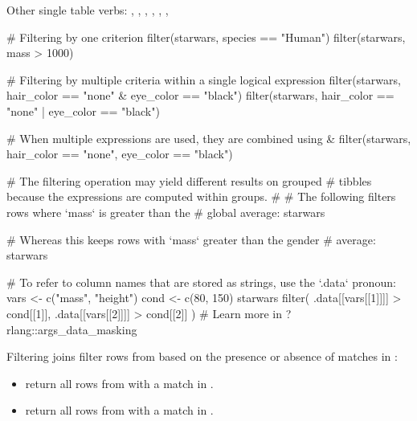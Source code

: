 \documentclass[a4paper]{book}
\begin{document}
%
\begin{SeeAlso}
Other single table verbs: 
,
,
,
,
,
,
\end{SeeAlso}
%
\begin{Examples}
\begin{ExampleCode}
# Filtering by one criterion
filter(starwars, species == "Human")
filter(starwars, mass > 1000)

# Filtering by multiple criteria within a single logical expression
filter(starwars, hair_color == "none" & eye_color == "black")
filter(starwars, hair_color == "none" | eye_color == "black")

# When multiple expressions are used, they are combined using &
filter(starwars, hair_color == "none", eye_color == "black")


# The filtering operation may yield different results on grouped
# tibbles because the expressions are computed within groups.
#
# The following filters rows where `mass` is greater than the
# global average:
starwars %

# Whereas this keeps rows with `mass` greater than the gender
# average:
starwars %


# To refer to column names that are stored as strings, use the `.data` pronoun:
vars <- c("mass", "height")
cond <- c(80, 150)
starwars %
  filter(
    .data[[vars[[1]]]] > cond[[1]],
    .data[[vars[[2]]]] > cond[[2]]
  )
# Learn more in ?rlang::args_data_masking
\end{ExampleCode}
\end{Examples}
%
\begin{Description}
Filtering joins filter rows from  based on the presence or absence
of matches in :
\begin{itemize}

\item{}  return all rows from  with a match in .
\item{}  return all rows from  with a match in .

\end{itemize}

\end{Description}
\end{document}
